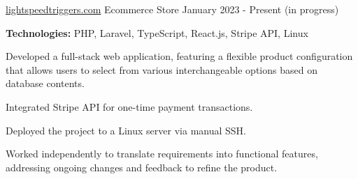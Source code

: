 \begin{cventries}
  \cventry
    {\href{https://lightspeedtriggers.com}{lightspeedtriggers.com}} %
    {Ecommerce Store} %
    {January 2023 - Present (in progress)} %
    {} %
    {
      \begin{cvitems} %
        \item {\textbf{Technologies:} PHP, Laravel, TypeScript, React.js, Stripe API, Linux}
        \item {Developed a full-stack web application, featuring a flexible product configuration that allows users to select from various interchangeable options based on database contents.}
        \item {Integrated Stripe API for one-time payment transactions.}
        \item {Deployed the project to a Linux server via manual SSH.}
        \item {Worked independently to translate requirements into functional features, addressing ongoing changes and feedback to refine the product.}
      \end{cvitems}
    }





\end{cventries}
